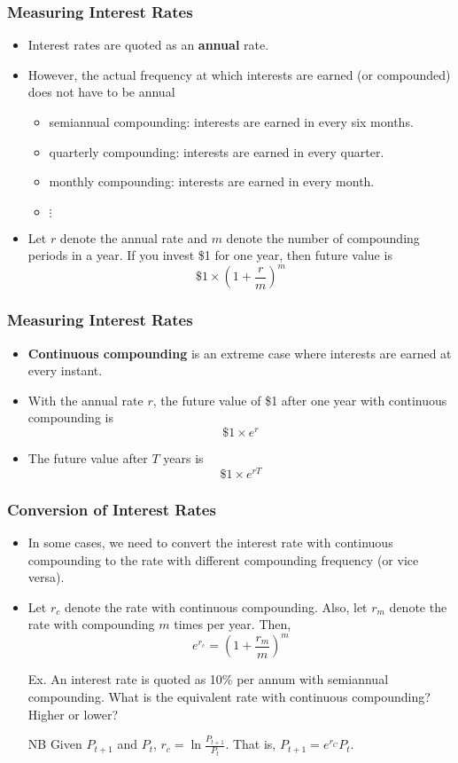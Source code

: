 \documentclass[10pt]{beamer}
\begin{document}
\begin{frame}
	\frametitle{Measuring Interest Rates}
	\begin{itemize} \itemsep15pt
		\item Interest rates are quoted as an \textbf{annual} rate.
		\item However, the actual frequency at which interests are earned (or compounded) does not have to be annual  \vspace{5pt}
		\begin{itemize}\itemsep5pt
			\item semiannual compounding: interests are earned in every six months.
			\item quarterly compounding: interests are earned in every quarter.
			\item monthly compounding: interests are earned in every month.
			\item $\vdots$
		\end{itemize}
		\item Let $r$ denote the annual rate and $m$ denote the number of compounding periods in a year. If you invest \$1 for one year, then future value is
		$$
			\$1\times\left( 1 + \frac{r}{m} \right)^m
		$$
	\end{itemize}
\end{frame}

\begin{frame}
	\frametitle{Measuring Interest Rates}
	\begin{itemize}\itemsep20pt
		\item \textbf{Continuous compounding} is an extreme case where interests are earned at every instant.
		\item With the annual rate $r$, the future value of \$1 after one year with continuous compounding is
		$$
			\$1\times e^{r}
		$$
		\item The future value after $T$ years is
		$$
			\$1\times e^{rT}
		$$
	\end{itemize}
\end{frame}



\begin{frame}
	\frametitle{Conversion of Interest Rates}
	\begin{itemize}\itemsep20pt
		\item In some cases, we need to convert the interest rate with continuous compounding to the rate with different compounding frequency (or vice versa).
		\item Let $r_c$ denote the rate with continuous compounding. Also, let $r_m$ denote the rate with compounding $m$ times per year. Then,
		$$
			e^{r_c} =\left( 1+ \frac{r_m}{m} \right)^m
		$$
		\item[Ex.] An interest rate is quoted as 10\% per annum with semiannual compounding. What is the equivalent rate with continuous compounding? Higher or lower?
		\item[NB] Given $P_{t+1}$ and $P_t$,  $r_c =\ln\frac{P_{t+1}}{P_t} $. That is, $P_{t+1}=e^{r_C}P_t$.
	\end{itemize}
\end{frame}
\end{document}
